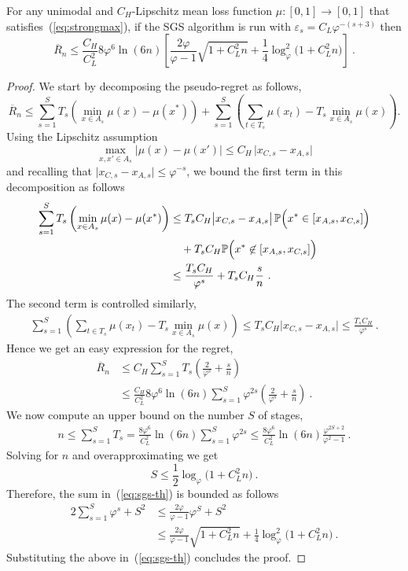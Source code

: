 \documentclass[11pt]{hackednow}
\renewcommand{\phi}{\varphi}
\renewcommand{\P}{\mathbb{P}}
\newcommand{\oR}{\overline{R}}
\newcommand{\ve}{\varepsilon}
\begin{document}
\begin{theorem}
For any unimodal and $C_H$-Lipschitz mean loss function $\mu : [0,1] \to [0,1]$ that satisfies~(\ref{eq:strongmax}),
if the SGS algorithm is run with $\ve_s = C_L\varphi^{-(s+3)}$ then
\[
    \oR_n \le \frac{C_H}{C_L^2}8\varphi^6\ln(6n) \left[ \frac{2\varphi}{\varphi-1}\sqrt{1 + C_L^2 n} + \frac{1}{4}\log_{\phi}^2\bigl(1 + C_L^2 n\bigr) \right]~.
\]
\end{theorem}
\begin{proof}
We start by decomposing the pseudo-regret as follows,
$$\oR_n \leq \sum_{s=1}^S T_s \left(\min_{x \in A_s}\mu(x) - \mu(x^*)\right) + \sum_{s=1}^S \left( \sum_{t\in T_s} \mu(x_t) - T_s \min_{x \in A_s} \mu(x) \right) .$$
Using the Lipschitz assumption
\[
    \max_{x,x'\in A_s}\bigl|\mu(x)-\mu(x')\bigr| \le C_H\,\bigl|x_{C,s} - x_{A,s}\bigr|
\]
and recalling that $\bigl|x_{C,s} - x_{A,s}\bigr| \le \varphi^{-s}$, we bound the first term in this decomposition as follows
\begin{align*}
    \sum_{s=1}^S T_s \left(\min_{x \in A_s}\mu(x) - \mu(x^*)\right)
&\le
    T_s C_H \bigl|x_{C,s} - x_{A,s}\bigr| \, \P\Bigl(x^* \in [x_{A,s},x_{C,s}]\Bigr)
\\ &\quad
    + T_s C_H \P\Bigl(x^* \not\in [x_{A,s},x_{C,s}]\Bigr)
\\ &\le
    \frac{T_s C_H}{\varphi^s} + T_s C_H \frac{s}{n}~.
\end{align*}
The second term is controlled similarly,
\begin{align*}
    \sum_{s=1}^S \left( \sum_{t\in T_s} \mu(x_t) - T_s \min_{x \in A_s} \mu(x) \right)
\le
    T_s C_H \bigl|x_{C,s} - x_{A,s}\bigr|
\le
    \frac{T_s C_H}{\varphi^s}~.
\end{align*}
Hence we get an easy expression for the regret,
\begin{align}
\nonumber
    \oR_n
&\le
    C_H \sum_{s=1}^S T_s\left(\frac{2}{\varphi^s} + \frac{s}{n}\right)
\\& \le
\label{eq:sgs-th}
    \frac{C_H}{C_L^2}8\varphi^6\ln(6n) \sum_{s=1}^S \varphi^{2s}\left(\frac{2}{\varphi^s} + \frac{s}{n}\right)~.
\end{align}
We now compute an upper bound on the number $S$ of stages,
\begin{align*}
    n \le \sum_{s=1}^S T_s = \frac{8\varphi^6}{C_L^2}\ln(6n)\sum_{s=1}^S \varphi^{2s} \le \frac{8\varphi^6}{C_L^2}\ln(6n)\frac{\varphi^{2S+2}}{\varphi^2 - 1}~.
\end{align*}
Solving for $n$ and overapproximating we get
\[
    S \le \frac{1}{2}\log_{\phi}\bigl(1 + C_L^2 n\bigr)~.
\]
Therefore, the sum in~(\ref{eq:sgs-th}) is bounded as follows 
\begin{align*}
    2\sum_{s=1}^S \varphi^s + S^2
&\le
    \frac{2\varphi}{\varphi-1}\varphi^S + S^2
\\&\le
    \frac{2\varphi}{\varphi-1}\sqrt{1 + C_L^2 n} + \frac{1}{4}\log_{\phi}^2\bigl(1 + C_L^2 n\bigr)~.
\end{align*}
Substituting the above in~(\ref{eq:sgs-th}) concludes the proof.
\end{proof}
\end{document}
